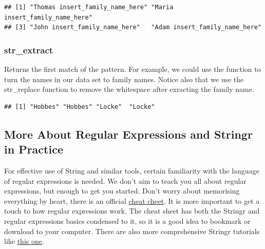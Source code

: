 \documentclass[
]{book}
\newenvironment{Shaded}{\begin{snugshade}}{\end{snugshade}}
\newcommand{\AttributeTok}[1]{\textcolor[rgb]{0.77,0.63,0.00}{#1}}
\newcommand{\FunctionTok}[1]{\textcolor[rgb]{0.00,0.00,0.00}{#1}}
\newcommand{\NormalTok}[1]{#1}
\newcommand{\OtherTok}[1]{\textcolor[rgb]{0.56,0.35,0.01}{#1}}
\newcommand{\SpecialCharTok}[1]{\textcolor[rgb]{0.00,0.00,0.00}{#1}}
\newcommand{\StringTok}[1]{\textcolor[rgb]{0.31,0.60,0.02}{#1}}
\begin{document}
\begin{verbatim}
## [1] "Thomas insert_family_name_here" "Maria insert_family_name_here" 
## [3] "John insert_family_name_here"   "Adam insert_family_name_here"
\end{verbatim}

\hypertarget{str_extract}{%
\subsubsection{str\_extract}\label{str_extract}}

Returns the first match of the pattern. For example, we could use the function to turn the names in our data set to family names. Notice also that we use the str\_replace function to remove the whitespace after exracting the family name.

\begin{Shaded}
\end{Shaded}

\begin{verbatim}
## [1] "Hobbes" "Hobbes" "Locke"  "Locke"
\end{verbatim}

\hypertarget{more-about-regular-expressions-and-stringr-in-practice}{%
\subsection{More About Regular Expressions and Stringr in Practice}\label{more-about-regular-expressions-and-stringr-in-practice}}

For effective use of String and similar tools, certain familiarity with the language of regular expressions is needed. We don't aim
to teach you all about regular expressions, but enough to get you started. Don't worry about memorising everything by heart, there is an official \href{https://evoldyn.gitlab.io/evomics-2018/ref-sheets/R_strings.pdf}{cheat cheet}. It is more important to get a touch to how
regular expressions work. The cheat sheet has both the Stringr and regular expressions basics condensed to it, so it is a good idea to bookmark or download to your computer. There are also more comprehensive Stringr tutorials like \href{https://r4ds.had.co.nz/strings.html}{this one}.
\end{document}
